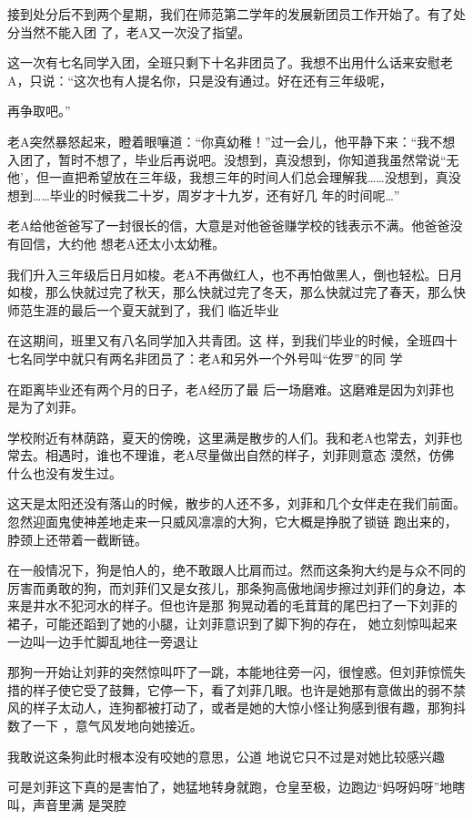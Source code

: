 \documentclass{article}
\begin{document}
接到处分后不到两个星期，我们在师范第二学年的发展新团员工作开始了。有了处分当然不能入团
了，老A又一次没了指望。 

这一次有七名同学入团，全班只剩下十名非团员了。我想不出用什么话来安慰老A，只说：“这次也有人提名你，只是没有通过。好在还有三年级呢，
\newpage

再争取吧。” 

老A突然暴怒起来，瞪着眼嚷道：“你真幼稚！”过一会儿，他平静下来：“我不想入团了，暂时不想了，毕业后再说吧。没想到，真没想到，你知道我虽然常说“无他’，但一直把希望放在三年级，我想三年的时间人们总会理解我……没想到，真没想到……毕业的时候我二十岁，周岁才十九岁，还有好几
年的时间呢…” 

老A给他爸爸写了一封很长的信，大意是对他爸爸赚学校的钱表示不满。他爸爸没有回信，大约他
想老A还太小太幼稚。 

我们升入三年级后日月如梭。老A不再做红人，也不再怕做黑人，倒也轻松。日月如梭，那么快就过完了秋天，那么快就过完了冬天，那么快就过完了春天，那么快师范生涯的最后一个夏天就到了，我们
临近毕业 

在这期间，班里又有八名同学加入共青团。这
\newpage
样，到我们毕业的时候，全班四十七名同学中就只有两名非团员了：老A和另外一个外号叫“佐罗”的同
学 

在距离毕业还有两个月的日子，老A经历了最
后一场磨难。这磨难是因为刘菲也是为了刘菲。 

学校附近有林荫路，夏天的傍晚，这里满是散步的人们。我和老A也常去，刘菲也常去。相遇时，谁也不理谁，老A尽量做出自然的样子，刘菲则意态
漠然，仿佛什么也没有发生过。 

这天是太阳还没有落山的时候，散步的人还不多，刘菲和几个女伴走在我们前面。忽然迎面鬼使神差地走来一只威风凛凛的大狗，它大概是挣脱了锁链
跑出来的，脖颈上还带着一截断链。 

在一般情况下，狗是怕人的，绝不敢跟人比肩而过。然而这条狗大约是与众不同的厉害而勇敢的狗，而刘菲们又是女孩儿，那条狗高傲地阔步擦过刘菲们的身边，本来是井水不犯河水的样子。但也许是那
\newpage
狗晃动着的毛茸茸的尾巴扫了一下刘菲的裙子，可能还蹈到了她的小腿，让刘菲意识到了脚下狗的存在，
她立刻惊叫起来一边叫一边手忙脚乱地往一旁退让 

那狗一开始让刘菲的突然惊叫吓了一跳，本能地往旁一闪，很惶惑。但刘菲惊慌失措的样子使它受了鼓舞，它停一下，看了刘菲几眼。也许是她那有意做出的弱不禁风的样子太动人，连狗都被打动了，或者是她的大惊小怪让狗感到很有趣，那狗抖数了一下
，意气风发地向她接近。 

我敢说这条狗此时根本没有咬她的意思，公道
地说它只不过是对她比较感兴趣 

可是刘菲这下真的是害怕了，她猛地转身就跑，仓皇至极，边跑边“妈呀妈呀”地瞎叫，声音里满
是哭腔 
\end{document}
